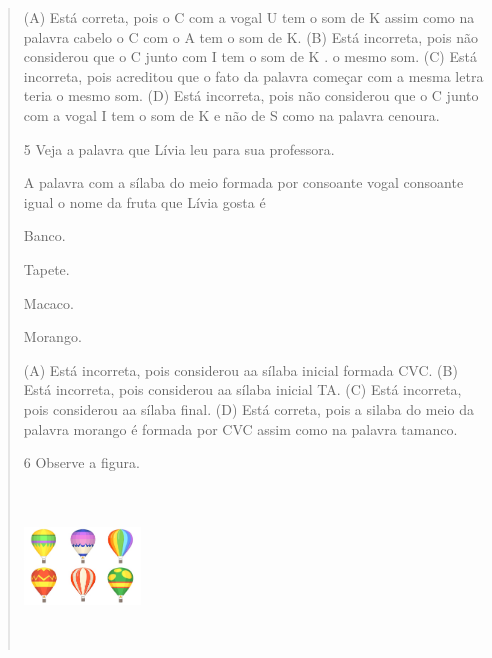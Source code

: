 \begin{verse}
(A) Está correta, pois o C com a vogal U tem o som de K assim como na
palavra cabelo o C com o A tem o som de K.
(B) Está incorreta, pois não considerou que o C junto com I tem o som de
K . o mesmo som.
(C) Está incorreta, pois acreditou que o fato da palavra começar com a
mesma letra teria o mesmo som.
(D) Está incorreta, pois não considerou que o C junto com a vogal I tem
o som de K e não de S como na palavra cenoura.

\num{5} Veja a palavra que Lívia leu para sua professora.

A palavra com a sílaba do meio formada por consoante vogal consoante
igual o nome da fruta que Lívia gosta é

\begin{minipage}{.5\textwidth}
\begin{escolha}
\item Banco.

\item Tapete.

\item Macaco.

\item Morango.
\end{escolha}
\end{minipage}

(A) Está incorreta, pois considerou aa sílaba inicial formada CVC.
(B) Está incorreta, pois considerou aa sílaba inicial TA.
(C) Está incorreta, pois considerou aa sílaba final.
(D) Está correta, pois a silaba do meio da palavra morango é formada por
CVC assim como na palavra tamanco.

\num{6} Observe a figura.

\includegraphics[width=1.22569in,height=1.65417in]{media/image167.jpeg}



\end{verse}
